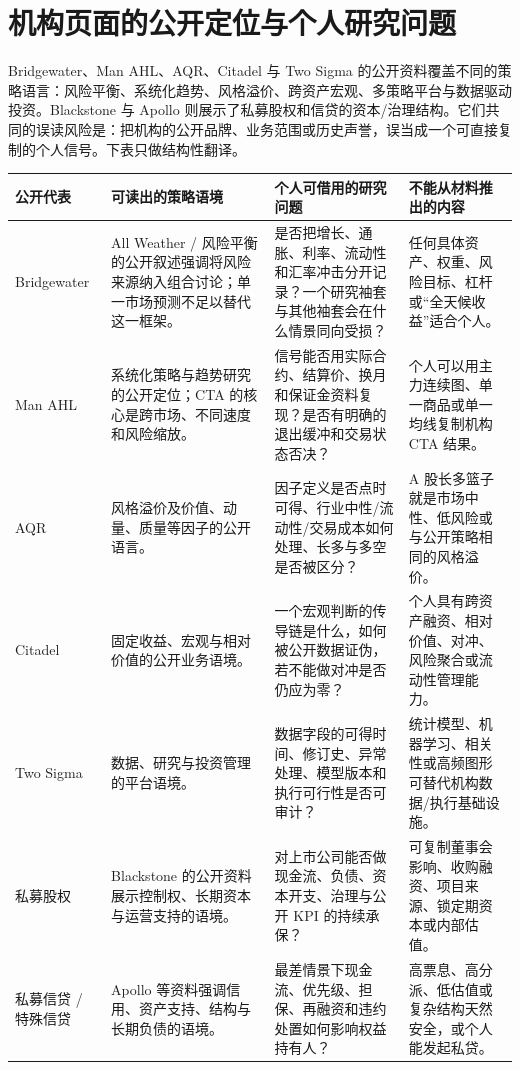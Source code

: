 \section{机构页面的公开定位与个人研究问题}

Bridgewater、Man AHL、AQR、Citadel 与 Two Sigma 的公开资料覆盖不同的策略语言：风险平衡、系统化趋势、风格溢价、跨资产宏观、多策略平台与数据驱动投资。Blackstone 与 Apollo 则展示了私募股权和信贷的资本/治理结构。它们共同的误读风险是：把机构的公开品牌、业务范围或历史声誉，误当成一个可直接复制的个人信号。下表只做结构性翻译。

\begin{exhibitbox}
\scriptsize
\begin{tabularx}{\exhibitboxwidth}{L{2.0cm} L{3.0cm} X L{3.1cm}}
\toprule
\textbf{公开代表} & \textbf{可读出的策略语境} & \textbf{个人可借用的研究问题} & \textbf{不能从材料推出的内容} \\
\midrule
Bridgewater & All Weather / 风险平衡的公开叙述强调将风险来源纳入组合讨论；单一市场预测不足以替代这一框架。 & 是否把增长、通胀、利率、流动性和汇率冲击分开记录？一个研究袖套与其他袖套会在什么情景同向受损？ & 任何具体资产、权重、风险目标、杠杆或“全天候收益”适合个人。 \\
Man AHL & 系统化策略与趋势研究的公开定位；CTA 的核心是跨市场、不同速度和风险缩放。 & 信号能否用实际合约、结算价、换月和保证金资料复现？是否有明确的退出缓冲和交易状态否决？ & 个人可以用主力连续图、单一商品或单一均线复制机构 CTA 结果。 \\
AQR & 风格溢价及价值、动量、质量等因子的公开语言。 & 因子定义是否点时可得、行业中性/流动性/交易成本如何处理、长多与多空是否被区分？ & A 股长多篮子就是市场中性、低风险或与公开策略相同的风格溢价。 \\
Citadel & 固定收益、宏观与相对价值的公开业务语境。 & 一个宏观判断的传导链是什么，如何被公开数据证伪，若不能做对冲是否仍应为零？ & 个人具有跨资产融资、相对价值、对冲、风险聚合或流动性管理能力。 \\
Two Sigma & 数据、研究与投资管理的平台语境。 & 数据字段的可得时间、修订史、异常处理、模型版本和执行可行性是否可审计？ & 统计模型、机器学习、相关性或高频图形可替代机构数据/执行基础设施。 \\
私募股权 & Blackstone 的公开资料展示控制权、长期资本与运营支持的语境。 & 对上市公司能否做现金流、负债、资本开支、治理与公开 KPI 的持续承保？ & 可复制董事会影响、收购融资、项目来源、锁定期资本或内部估值。 \\
私募信贷 / 特殊信贷 & Apollo 等资料强调信用、资产支持、结构与长期负债的语境。 & 最差情景下现金流、优先级、担保、再融资和违约处置如何影响权益持有人？ & 高票息、高分派、低估值或复杂结构天然安全，或个人能发起私贷。 \\
\bottomrule
\end{tabularx}
\end{exhibitbox}

